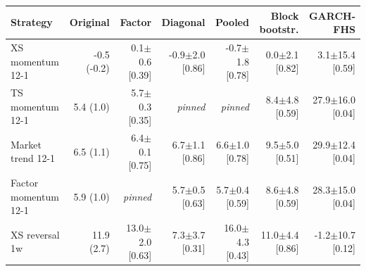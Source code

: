 \begin{tabular}{lrrrrrr}
\toprule
Strategy & Original & Factor & Diagonal & Pooled & Block bootstr. & GARCH-FHS \\
\midrule
XS momentum 12-1 & -0.5 (-0.2) & 0.1$\pm$0.6 [0.39] & -0.9$\pm$2.0 [0.86] & -0.7$\pm$1.8 [0.78] & 0.0$\pm$2.1 [0.82] & 3.1$\pm$15.4 [0.59] \\
TS momentum 12-1 & 5.4 (1.0) & 5.7$\pm$0.3 [0.35] & \emph{pinned} & \emph{pinned} & 8.4$\pm$4.8 [0.59] & 27.9$\pm$16.0 [0.04] \\
Market trend 12-1 & 6.5 (1.1) & 6.4$\pm$0.1 [0.75] & 6.7$\pm$1.1 [0.86] & 6.6$\pm$1.0 [0.78] & 9.5$\pm$5.0 [0.51] & 29.9$\pm$12.4 [0.04] \\
Factor momentum 12-1 & 5.9 (1.0) & \emph{pinned} & 5.7$\pm$0.5 [0.63] & 5.7$\pm$0.4 [0.59] & 8.6$\pm$4.8 [0.59] & 28.3$\pm$15.0 [0.04] \\
XS reversal 1w & 11.9 (2.7) & 13.0$\pm$2.0 [0.63] & 7.3$\pm$3.7 [0.31] & 16.0$\pm$4.3 [0.43] & 11.0$\pm$4.4 [0.86] & -1.2$\pm$10.7 [0.12] \\
\bottomrule
\end{tabular}